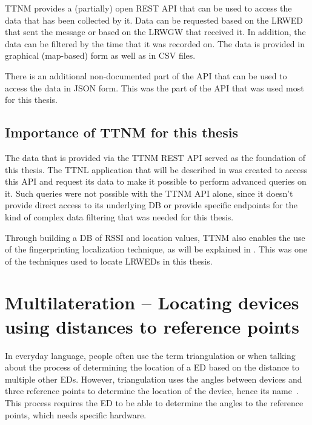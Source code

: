 \ac{TTNM} provides a (partially) open \ac{REST} \ac{API} that can be used to access the data that has been collected by it.
Data can be requested based on the \acl{LRWED} that sent the message or based on the \acl{LRWGW} that received it.
In addition, the data can be filtered by the time that it was recorded on.
The data is provided in graphical (map-based) form as well as in \ac{CSV} files.

There is an additional non-documented part of the \ac{API} that can be used to access the data in \ac{JSON} form.
This was the part of the \ac{API} that was used most for this thesis.

\subsection{Importance of \acl{TTNM} for this thesis}\label{sec:ttn-mapper-importance}

The data that is provided via the \ac{TTNM} \ac{REST} \ac{API} served as the foundation of this thesis.
The \ac{TTNL} application that will be described in  was created to access this \ac{API} and request its data to make it possible to perform advanced queries on it.
Such queries were not possible with the \ac{TTNM} \ac{API} alone, since it doesn't provide direct access to its underlying \ac{DB} or provide specific endpoints for the kind of complex data filtering that was needed for this thesis.

Through building a \ac{DB} of \ac{RSSI} and location values, \ac{TTNM} also enables the use of the fingerprinting localization technique, as will be explained in .
This was one of the techniques used to locate \aclp{LRWED} in this thesis.

\section{Multilateration – Locating devices using distances to reference points}\label{sec:multilateration-basics}

In everyday language, people often use the term triangulation or when talking about the process of determining the location of a \acl{ED} based on the distance to multiple other \aclp{ED}.
However, triangulation uses the angles between devices and three reference points to determine the location of the device, hence its name~\cite{yaro_multiangulation_2017}.
This process requires the \acl{ED} to be able to determine the angles to the reference points, which needs specific hardware.

